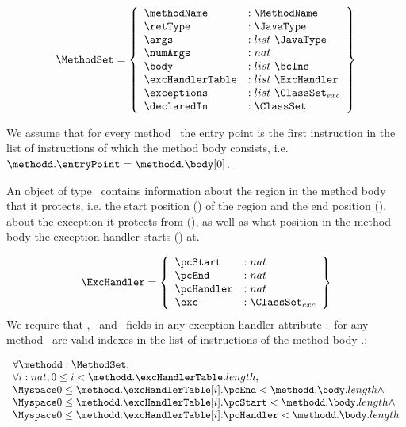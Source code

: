  $$ \begin{array}{l} %
                     \MethodSet  = \left\{\begin{array}{ll}  \methodName & :\MethodName \\
						             \retType & :\JavaType\\
							     \args &  : list \  \JavaType \\
							     \numArgs & : nat \\
							     \body &  : list \ \bcIns \\
							     \excHandlerTable & : list \ \ExcHandler \\
							     \exceptions & : list \ \ClassSet_{exc}\\
							     \declaredIn  &  : \ClassSet
                                     \end{array}  \right\}
     \end{array} $$
  
 We assume that for every method \methodd \ the entry point is the first instruction in the list of instructions 
 of which the method body consists, i.e. $ \methodd.\entryPoint =\methodd.\body[0]$.

 An object of type \ExcHandler \ contains information about the region in the method body that it protects, i.e. the start
 position (\pcStart) of the region and the end position (\pcEnd), about the exception it protects from (\exc),
 as well as what position in the method body the exception handler starts (\pcHandler) at.


 $$ \begin{array}{l}  
                 \ExcHandler = \left\{\begin{array}{ll} \pcStart & : nat \\
						          \pcEnd & : nat \\
							  \pcHandler &  : nat \\
							  \exc & : \ClassSet_{exc} 
                                        \end{array}  \right\}
     \end{array} $$
   We require that \pcStart, \pcEnd \ and \pcHandler \ fields in any exception handler attribute \methodd.\excHandlerTable \ for any method \methodd \
   are valid indexes in the list  of instructions of the method body  \methodd.\body :
 
$$ \begin{array}{l}  \forall \methodd: \MethodSet,  \\
                      \forall i:nat, 0 \le i <  \methodd.\excHandlerTable.length,  \\
                            \Myspace 0 \le \methodd.\excHandlerTable[i].\pcEnd <  \methodd.\body.length \wedge  \\
			    \Myspace 0 \le \methodd.\excHandlerTable[i].\pcStart <  \methodd.\body.length  \wedge \\
			    \Myspace 0 \le \methodd.\excHandlerTable[i].\pcHandler <  \methodd.\body.length  
    \end{array}
 $$


 
  
